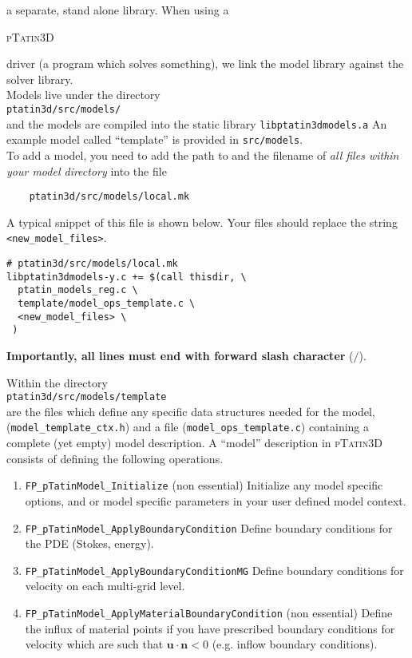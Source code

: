 \documentclass[paper=a4, fontsize=10pt,twoside]{scrartcl}
\newcommand{\ptat}{{{\textsc{pTatin3D}}}}
\newcommand{\shellcmd}[1]{\\\indent\indent\texttt{\hspace{5mm}\footnotesize #1}\\}
\newcommand{\unix}[1]{\texttt{\footnotesize #1}}
\begin{document}
a separate, stand alone library. When using a {\ptat{ driver (a program which solves something),
we link the model library against the solver library.
\\[8pt]
Models live under the directory
	\shellcmd{ptatin3d/src/models/}
and the models are compiled into the static library \unix{libptatin3dmodels.a}
An example model called ``template'' is provided in \unix{src/models}.
\\[8pt]
To add a model, you need to add the path to and the filename of \textit{all files within your model directory} into the file
\begin{lstlisting}
	ptatin3d/src/models/local.mk
\end{lstlisting}
A typical snippet of this file is shown below.
Your files should replace the string \texttt{<new\_model\_files>}.
\begin{lstlisting}
# ptatin3d/src/models/local.mk
libptatin3dmodels-y.c += $(call thisdir, \
  ptatin_models_reg.c \
  template/model_ops_template.c \
  <new_model_files> \
 )
\end{lstlisting}
\textbf{Importantly, all lines must end with forward slash character} ($\slash$).

Within the directory
	\shellcmd{ptatin3d/src/models/template}
are the files which define any specific data structures needed for the model,
	(\unix{model\_template\_ctx.h})
and a file (\unix{model\_ops\_template.c}) containing a complete (yet empty) model description.
A ``model'' description in {\ptat} consists of defining the following operations.
\begin{enumerate}
	\item \unix{FP\_pTatinModel\_Initialize} (non essential)
	Initialize any model specific options, and or model specific parameters in your user defined model context.

	\item \unix{FP\_pTatinModel\_ApplyBoundaryCondition}
	Define boundary conditions for the PDE (Stokes, energy).

	\item \unix{FP\_pTatinModel\_ApplyBoundaryConditionMG}
	Define boundary conditions for velocity on each multi-grid level.

	\item \unix{FP\_pTatinModel\_ApplyMaterialBoundaryCondition} (non essential)
	Define the influx of material points if you have prescribed boundary conditions for velocity which are such that $\boldsymbol u \cdot \boldsymbol n < 0$ (e.g. inflow boundary conditions).


\end{enumerate}}}
\end{document}
